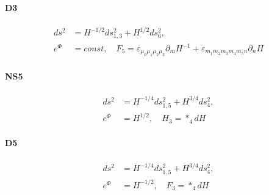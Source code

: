 \paragraph{D3}

\begin{align}
ds^2 
&= H^{-1/2}ds_{1,3}^2 + H^{1/2}ds_6^2,\\
e^\Phi
&= const,\quad
F_5 = \varepsilon_{\mu_0\mu_1\mu_2\mu_3}\partial_m H^{-1} + \varepsilon_{m_1m_2m_3m_4m_5 n}\partial_n H
\end{align}



\paragraph{NS5}
\begin{align}
ds^2 
&= H^{-1/4}ds_{1,5}^2 + H^{3/4}ds_4^2,\\
e^{\Phi}
&= H^{1/2},\quad H_3 = *_4 dH
\end{align}

\paragraph{D5}
\begin{align}
ds^2 
&= H^{-1/4}ds_{1,5}^2 + H^{3/4}ds_4^2,\\
e^{\Phi}
&= H^{-1/2},\quad F_3 = *_4 dH
\end{align}